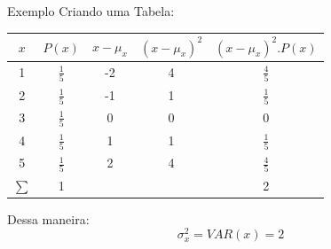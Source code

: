 \documentclass[hyperref={pdfpagelabels=false}]{beamer}
\begin{document}
\begin{frame}{Exemplo}
	Criando uma Tabela:
	\centering
	\begin{tabular}{|c|c|c|c|c|}
		\hline 
		$x$ & $P(x)$ & $x - \mu_x$ & $(x - \mu_x)^2$ & $(x-\mu_x)^2 . P(x)$ \\ 
		\hline 
		1 & $\displaystyle \frac{1}{5}$ & -2 & 4 & $\displaystyle \frac{4}{5}$ \\ 
		\hline 
		2 & $\displaystyle \frac{1}{5}$ & -1 & 1 & $\displaystyle \frac{1}{5}$ \\ 
		\hline 
		3 & $\displaystyle \frac{1}{5}$ & 0 & 0 & 0 \\ 
		\hline 
		4 & $\displaystyle \frac{1}{5}$ & 1 & 1 & $\displaystyle \frac{1}{5}$ \\ 
		\hline 
		5 & $\displaystyle \frac{1}{5}$ & 2 & 4 & $\displaystyle \frac{4}{5}$ \\ 
		\hline 
		$\displaystyle \sum$ & 1 &  &  & 2 \\ 
		\hline 
	\end{tabular} 

\pause
Dessa maneira:
$$\sigma_{x}^2 = VAR(x) = 2$$
\end{frame}
\end{document}
